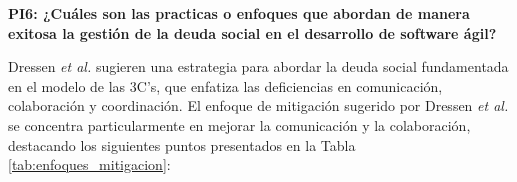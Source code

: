 \textbf{PI6: ¿Cuáles son las practicas o enfoques que abordan de manera exitosa la gestión de la deuda social en el desarrollo de software ágil?}

Dressen \textit{et al.} \cite{dreesen2021socialdebt} sugieren una estrategia para abordar la deuda social fundamentada en el modelo de las 3C’s, que enfatiza las deficiencias en comunicación, colaboración y coordinación. El enfoque de mitigación sugerido por Dressen \textit{et al.} \cite{dreesen2021socialdebt} se concentra particularmente en mejorar la comunicación y la colaboración, destacando los siguientes puntos presentados en la Tabla \ref{tab:enfoques_mitigacion}:

\begingroup
\scriptsize
\setlength{\LTleft}{0pt} %
\setlength{\LTright}{0pt} %
\setlength{\tabcolsep}{4pt} %
\renewcommand{\arraystretch}{1.4}

